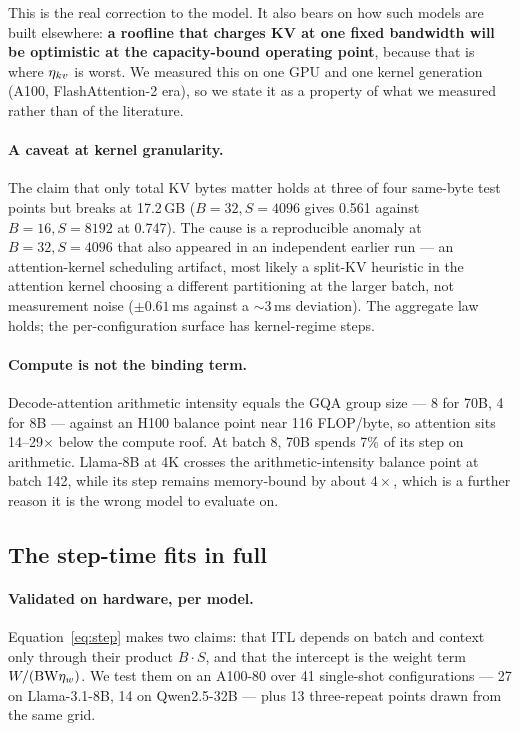 This is the real correction to the model. It also bears on how such models are
built elsewhere: \textbf{a roofline that charges KV at one fixed bandwidth will
be optimistic at the capacity-bound operating point}, because that is where
$\eta_{kv}$ is worst. We measured this on one GPU and one kernel generation
(A100, FlashAttention-2 era), so we state it as a property of what we measured
rather than of the literature.

\paragraph{A caveat at kernel granularity.} The claim that only total KV bytes
matter holds at three of four same-byte test points but breaks at 17.2\,GB
($B{=}32,S{=}4096$ gives 0.561 against $B{=}16,S{=}8192$ at 0.747). The cause
is a reproducible anomaly at $B{=}32,S{=}4096$ that also appeared in an
independent earlier run --- an attention-kernel scheduling artifact, most
likely a split-KV heuristic in the attention kernel choosing a different
partitioning at the larger batch, not measurement noise ($\pm0.61$\,ms
against a $\sim$3\,ms deviation). The aggregate law holds; the
per-configuration surface has kernel-regime steps.

\paragraph{Compute is not the binding term.} Decode-attention arithmetic
intensity equals the GQA group size --- 8 for 70B, 4 for 8B --- against an
H100 balance point near 116 FLOP/byte, so attention sits 14--29$\times$ below
the compute roof. At batch 8, 70B spends 7\% of its step on arithmetic.
Llama-8B at 4K crosses the arithmetic-intensity balance point at batch 142, while its step remains memory-bound by about $4\times$, which is a further
reason it is the wrong model to evaluate on.



\subsection*{The step-time fits in full}

\paragraph{Validated on hardware, per model.} Equation~\ref{eq:step} makes two
claims: that ITL depends on batch and context only through their product
$B\cdot S$, and that the intercept is the weight term $W/(\mathrm{BW}\eta_w)$. We test
them on an A100-80 over 41 single-shot configurations --- 27 on Llama-3.1-8B, 14
on Qwen2.5-32B --- plus 13 three-repeat points drawn from the same grid.

